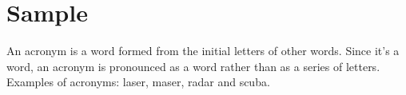 \documentclass{report}
\begin{document}
\tableofcontents

\chapter{Sample}

An acronym is a word formed from the initial letters of other words. 
Since it's a word, an acronym is pronounced as a word rather than as
a series of letters. Examples of acronyms: \gls{laser}, \gls{maser},
\gls{radar} and \gls{scuba}.

\printglossaries
\end{document}
